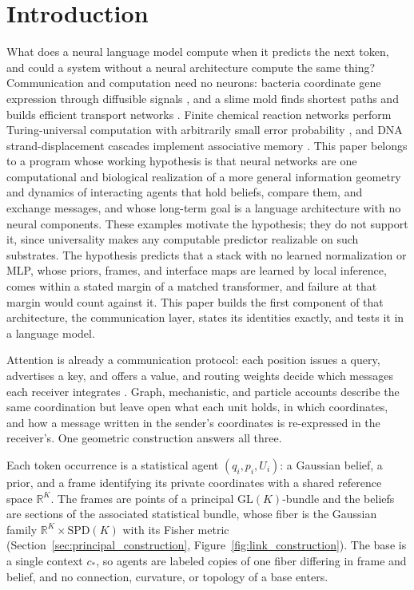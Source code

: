 \documentclass[twoside,11pt]{article}
\begin{document}

\section{Introduction}
\label{sec:intro}

What does a neural language model compute when it predicts the next token, and could a system without a neural architecture compute the same thing? Communication and computation need no neurons: bacteria coordinate gene expression through diffusible signals \citep{MillerBassler2001QuorumSensing}, and a slime mold finds shortest paths and builds efficient transport networks \citep{Nakagaki2000Maze,Tero2010NetworkDesign}. Finite chemical reaction networks perform Turing-universal computation with arbitrarily small error probability \citep{Soloveichik2008CRN}, and DNA strand-displacement cascades implement associative memory \citep{Qian2011DNANeural}. This paper belongs to a program whose working hypothesis is that neural networks are one computational and biological realization of a more general information geometry and dynamics of interacting agents that hold beliefs, compare them, and exchange messages, and whose long-term goal is a language architecture with no neural components. These examples motivate the hypothesis; they do not support it, since universality makes any computable predictor realizable on such substrates. The hypothesis predicts that a stack with no learned normalization or MLP, whose priors, frames, and interface maps are learned by local inference, comes within a stated margin of a matched transformer, and failure at that margin would count against it. This paper builds the first component of that architecture, the communication layer, states its identities exactly, and tests it in a language model.

Attention is already a communication protocol: each position issues a query, advertises a key, and offers a value, and routing weights decide which messages each receiver integrates \citep{vaswani2017attention}. Graph, mechanistic, and particle accounts describe the same coordination \citep{Gilmer2017MPNN,Joshi2025TransformersGNN,elhage2021mathematical,geshkovski2023mathematical} but leave open what each unit holds, in which coordinates, and how a message written in the sender's coordinates is re-expressed in the receiver's. One geometric construction answers all three.

Each token occurrence is a statistical agent $(q_i,p_i,U_i)$: a Gaussian belief, a prior, and a frame identifying its private coordinates with a shared reference space $\mathbb R^K$. The frames are points of a principal $\mathrm{GL}(K)$-bundle and the beliefs are sections of the associated statistical bundle, whose fiber is the Gaussian family $\mathbb R^K\times\mathrm{SPD}(K)$ with its Fisher metric \citep{AmariNagaoka2000} (Section~\ref{sec:principal_construction}, Figure~\ref{fig:link_construction}). The base is a single context $c_*$, so agents are labeled copies of one fiber differing in frame and belief, and no connection, curvature, or topology of a base enters.
\end{document}
